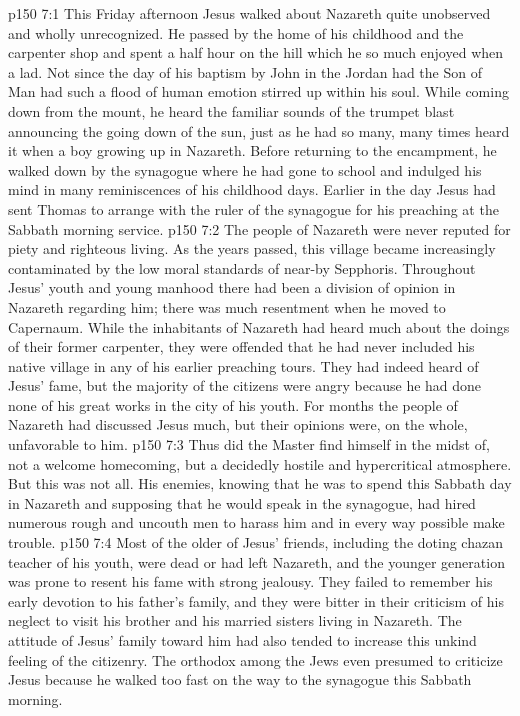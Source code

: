 \vs p150 7:1 This Friday afternoon Jesus walked about Nazareth quite unobserved and wholly unrecognized. He passed by the home of his childhood and the carpenter shop and spent a half hour on the hill which he so much enjoyed when a lad. Not since the day of his baptism by John in the Jordan had the Son of Man had such a flood of human emotion stirred up within his soul. While coming down from the mount, he heard the familiar sounds of the trumpet blast announcing the going down of the sun, just as he had so many, many times heard it when a boy growing up in Nazareth. Before returning to the encampment, he walked down by the synagogue where he had gone to school and indulged his mind in many reminiscences of his childhood days. Earlier in the day Jesus had sent Thomas to arrange with the ruler of the synagogue for his preaching at the Sabbath morning service.\plusone
\vs p150 7:2 The people of Nazareth were never reputed for piety and righteous living. As the years passed, this village became increasingly contaminated by the low moral standards of near\hyp{}by Sepphoris. Throughout Jesus’ youth and young manhood there had been a division of opinion in Nazareth regarding him; there was much resentment when he moved to Capernaum. While the inhabitants of Nazareth had heard much about the doings of their former carpenter, they were offended that he had never included his native village in any of his earlier preaching tours. They had indeed heard of Jesus’ fame, but the majority of the citizens were angry because he had done none of his great works in the city of his youth. For months the people of Nazareth had discussed Jesus much, but their opinions were, on the whole, unfavorable to him.
\vs p150 7:3 Thus did the Master find himself in the midst of, not a welcome homecoming, but a decidedly hostile and hypercritical atmosphere. But this was not all. His enemies, knowing that he was to spend this Sabbath day in Nazareth and supposing that he would speak in the synagogue, had hired numerous rough and uncouth men to harass him and in every way possible make trouble.
\vs p150 7:4 Most of the older of Jesus’ friends, including the doting chazan teacher of his youth, were dead or had left Nazareth, and the younger generation was prone to resent his fame with strong jealousy. They failed to remember his early devotion to his father’s family, and they were bitter in their criticism of his neglect to visit his brother and his married sisters living in Nazareth. The attitude of Jesus’ family toward him had also tended to increase this unkind feeling of the citizenry. The orthodox among the Jews even presumed to criticize Jesus because he walked too fast on the way to the synagogue this Sabbath morning.
